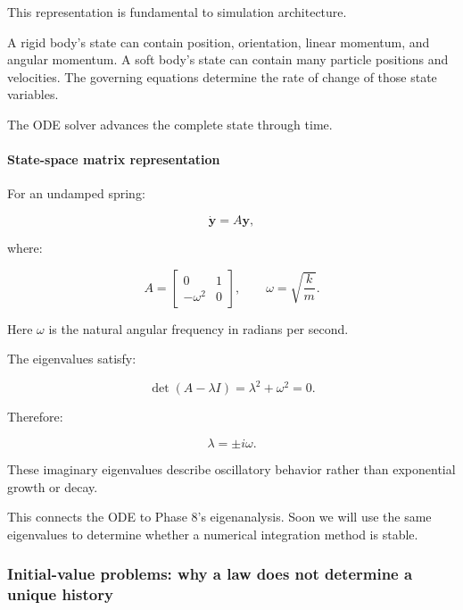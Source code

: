 This representation is fundamental to simulation architecture.

A rigid body's state can contain position, orientation, linear momentum, and angular momentum. A soft body's state can contain many particle positions and velocities. The governing equations determine the rate of change of those state variables.

The ODE solver advances the complete state through time.

\paragraph{State-space matrix representation}\label{02-foundations-ii-ch022-state-space-matrix-representation}

\hypertarget{02-foundations-ii-ch022-state-space-matrix-representation}{}

For an undamped spring:

\[
\dot{\mathbf y}=A\mathbf y,
\]

where:

\[
\boxed{ A= \begin{bmatrix} 0&1\\ -\omega^2&0 \end{bmatrix}, \qquad \omega=\sqrt{\frac{k}{m}} }.
\]

Here \(\omega\) is the natural angular frequency in radians per second.

The eigenvalues satisfy:

\[
\det(A-\lambda I) = \lambda^2+\omega^2=0.
\]

Therefore:

\[
\lambda=\pm i\omega.
\]

These imaginary eigenvalues describe oscillatory behavior rather than exponential growth or decay.

This connects the ODE to Phase 8's eigenanalysis. Soon we will use the same eigenvalues to determine whether a numerical integration method is stable.

\subsubsection{Initial-value problems: why a law does not determine a unique history}\label{02-foundations-ii-ch022-initial-value-problems-why-a-law-does-not-determine-a-unique-history}

\hypertarget{02-foundations-ii-ch022-initial-value-problems-why-a-law-does-not-determine-a-unique-history}{}

